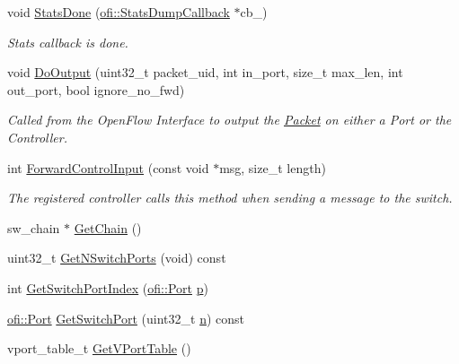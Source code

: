 \begin{DoxyCompactItemize}
void \hyperlink{classns3_1_1OpenFlowSwitchNetDevice_a8a4905d4cbb354ff27d89ecedd9cff5f}{Stats\+Done} (\hyperlink{structns3_1_1ofi_1_1StatsDumpCallback}{ofi\+::\+Stats\+Dump\+Callback} $\ast$cb\+\_\+)
\begin{DoxyCompactList}\small\item\em Stats callback is done. \end{DoxyCompactList}\item 
void \hyperlink{classns3_1_1OpenFlowSwitchNetDevice_a32ddf4836b4975a83cbf5e556a890c48}{Do\+Output} (uint32\+\_\+t packet\+\_\+uid, int in\+\_\+port, size\+\_\+t max\+\_\+len, int out\+\_\+port, bool ignore\+\_\+no\+\_\+fwd)
\begin{DoxyCompactList}\small\item\em Called from the Open\+Flow Interface to output the \hyperlink{classns3_1_1Packet}{Packet} on either a Port or the Controller. \end{DoxyCompactList}\item 
int \hyperlink{classns3_1_1OpenFlowSwitchNetDevice_a5442bdd0d556024442b1c4af38a41df8}{Forward\+Control\+Input} (const void $\ast$msg, size\+\_\+t length)
\begin{DoxyCompactList}\small\item\em The registered controller calls this method when sending a message to the switch. \end{DoxyCompactList}\item 
sw\+\_\+chain $\ast$ \hyperlink{classns3_1_1OpenFlowSwitchNetDevice_a27901b0defa5457880dc4106826997e7}{Get\+Chain} ()
\item 
uint32\+\_\+t \hyperlink{classns3_1_1OpenFlowSwitchNetDevice_a60a99198a982f9c0a75d21ba468d9c42}{Get\+N\+Switch\+Ports} (void) const 
\item 
int \hyperlink{classns3_1_1OpenFlowSwitchNetDevice_afc0283b966814417b89981940f3c5b51}{Get\+Switch\+Port\+Index} (\hyperlink{structns3_1_1ofi_1_1Port}{ofi\+::\+Port} \hyperlink{lte__link__budget__x2__handover__measures_8m_ac9de518908a968428863f829398a4e62}{p})
\item 
\hyperlink{structns3_1_1ofi_1_1Port}{ofi\+::\+Port} \hyperlink{classns3_1_1OpenFlowSwitchNetDevice_aa797150f34f80e22a2443043bf930728}{Get\+Switch\+Port} (uint32\+\_\+t \hyperlink{lte__link__budget__x2__handover__measures_8m_abdb05bc5a064cf642a06c83b3392f148}{n}) const 
\item 
vport\+\_\+table\+\_\+t \hyperlink{classns3_1_1OpenFlowSwitchNetDevice_a87ba400a91415ed84d9a1f82b08fff43}{Get\+V\+Port\+Table} ()
\item 

\end{DoxyCompactItemize}
